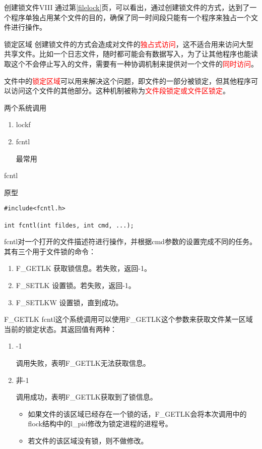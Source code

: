 \documentclass{beamer}
\begin{document}
\begin{frame}[fragile]{创建锁文件VIII}
通过第\ref{filelock}页，可以看出，通过创建锁文件的方式，达到了一个程序单独占用某个文件的目的，确保了同一时间段只能有一个程序来独占一个文件进行操作。
\end{frame}
\begin{frame}{锁定区域}
创建锁文件的方式会造成对文件的\textcolor{red}{独占式访问}，这不适合用来访问大型共享文件。比如一个日志文件，随时都可能会有数据写入，为了让其他程序也能读取这个不会停止写入的文件，需要有一种协调机制来提供对一个文件的\textcolor{red}{同时访问}。

文件中的\textcolor{red}{锁定区域}可以用来解决这个问题，即文件的一部分被锁定，但其他程序可以访问这个文件的其他部分。这种机制被称为\textcolor{red}{文件段锁定或文件区锁定}。

\begin{block}{两个系统调用}
\begin{enumerate}
\item
lockf
\item
fcntl

最常用
\end{enumerate}
\end{block}
\end{frame}
\begin{frame}[fragile]{fcntl}
\begin{block}{原型}
\begin{lstlisting}
#include<fcntl.h>

int fcntl(int fildes, int cmd, ...);
\end{lstlisting}
\end{block}
fcntl对一个打开的文件描述符进行操作，并根据cmd参数的设置完成不同的任务。其有三个用于文件锁的命令：
\begin{enumerate}
\label{flckcmd}
\item
F\_GETLK  获取锁信息。若失败，返回-1。
\item
F\_SETLK 设置锁。若失败，返回-1。
\item
F\_SETLKW 设置锁，直到成功。
\end{enumerate}
\end{frame}
\begin{frame}{F\_GETLK}
fcntl这个系统调用可以使用F\_GETLK这个参数来获取文件某一区域当前的锁定状态。其返回值有两种：
\begin{enumerate}
\item
-1

调用失败，表明F\_GETLK无法获取信息。
\item
非-1

调用成功，表明F\_GETLK获取到了锁信息。
\begin{itemize}
\item
如果文件的该区域已经存在一个锁的话，F\_GETLK会将本次调用中的flock结构中的l\_pid修改为锁定进程的进程号。
\item
若文件的该区域没有锁，则不做修改。
\end{itemize}
\end{enumerate}
\end{frame}
\end{document}
